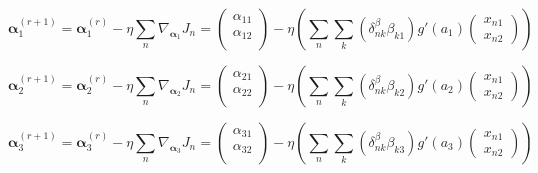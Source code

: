 \documentclass[12pt,a4paper]{article}%
\theoremstyle{definition}
\theoremstyle{plain}
\numberwithin{equation}{section}
\begin{document}
\begin{equation*}
\boldsymbol{\alpha}_{1}^{(r+1)} = \boldsymbol{\alpha}_{1}^{(r)} - \eta \sum\limits_{n} \nabla_{\boldsymbol{\alpha}_{1}} J_{n} = \begin{pmatrix}
  \alpha_{11} \\
  \alpha_{12} \\
 \end{pmatrix} - \eta \left( \sum\limits_{n} \sum\limits_{k} (\delta_{nk}^{\beta} \beta_{k1})g'(a_{1}) \begin{pmatrix}
  x_{n1} \\
  x_{n2} 
 \end{pmatrix} \right)
\end{equation*}

\begin{equation*}
\boldsymbol{\alpha}_{2}^{(r+1)} = \boldsymbol{\alpha}_{2}^{(r)} - \eta \sum\limits_{n} \nabla_{\boldsymbol{\alpha}_{2}} J_{n} = \begin{pmatrix}
  \alpha_{21} \\
  \alpha_{22} \\
 \end{pmatrix} - \eta \left( \sum\limits_{n} \sum\limits_{k} (\delta_{nk}^{\beta} \beta_{k2})g'(a_{2}) \begin{pmatrix}
  x_{n1} \\
  x_{n2} 
 \end{pmatrix} \right)
\end{equation*}

\begin{equation*}
\boldsymbol{\alpha}_{3}^{(r+1)} = \boldsymbol{\alpha}_{3}^{(r)} - \eta \sum\limits_{n} \nabla_{\boldsymbol{\alpha}_{3}} J_{n} = \begin{pmatrix}
  \alpha_{31} \\
  \alpha_{32} \\
 \end{pmatrix} - \eta \left( \sum\limits_{n} \sum\limits_{k} (\delta_{nk}^{\beta} \beta_{k3})g'(a_{3}) \begin{pmatrix}
  x_{n1} \\
  x_{n2} 
 \end{pmatrix} \right)
\end{equation*}
\end{document}
